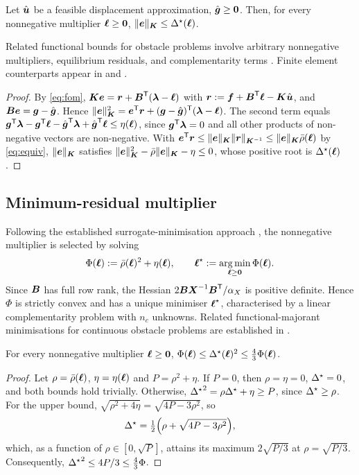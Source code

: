 \begin{proposition}\label{prop:certificate}
Let $\uh$ be a feasible displacement approximation, $\gh\ge\boldsymbol 0$. Then, for every nonnegative multiplier $\vell\ge\boldsymbol 0$, $\normK{\ve}\le\Dstar(\vell)$.
\end{proposition}
Related functional bounds for obstacle problems involve arbitrary nonnegative multipliers, equilibrium residuals, and complementarity terms
\cite[(2.12)--(2.13)]{repin2007}. Finite element counterparts appear in \cite[Lemma~1]{braess2005} and \cite[Sec.~4.2]{krause2015}.
\begin{proof}
By \eqref{eq:fom}, $\mK\ve=\vr+\mB\T(\vlam-\vell)$ with $\vr:=\vf+\mB\T\vell-\mK\uh$, and $\mB\ve=\vg-\gh$. Hence
$\normK{\ve}^2=\ve\T\vr+(\vg-\gh)\T(\vlam-\vell)$. The second term equals
$\vg\T\vlam-\vg\T\vell-\gh\T\vlam+\gh\T\vell\le\eta(\vell)$, since $\vg\T\vlam=0$ and all other products of non-negative vectors
are non-negative. With $\ve\T\vr\le\normK{\ve}\normKi{\vr}\le\normK{\ve}\rhob(\vell)$ by \eqref{eq:equiv}, $\normK{\ve}$ satisfies
$\normK{\ve}^2-\rhob\normK{\ve}-\eta\le0$, whose positive root is $\Dstar(\vell)$.
\end{proof}

\subsection{Minimum-residual multiplier}
Following the established surrogate-minimisation approach \cite{zhang2016thesis}, the nonnegative multiplier is selected by solving
\begin{equation}\label{eq:phi}
  \Phi(\vell):=\rhob(\vell)^2+\eta(\vell),\qquad \lmr:=\operatorname*{arg\,min}_{\vell\ge\boldsymbol 0}\Phi(\vell).
\end{equation}
Since $\mB$ has full row rank, the Hessian $2\mB\mX^{-1}\mB\T/\alpha_X$ is positive definite. Hence $\Phi$ is strictly convex and has a unique
minimiser $\lmr$, characterised by a linear complementarity problem with $n_c$ unknowns. Related functional-majorant minimisations for continuous
obstacle problems are established in \cite{repin2000,repin2007}.

\begin{lemma}\label{lem:phi}
For every nonnegative multiplier $\vell\ge\boldsymbol 0$, $\Phi(\vell)\le\Dstar(\vell)^2\le\frac43\Phi(\vell)$.
\end{lemma}
\begin{proof}
Let $\rho=\rhob(\vell)$, $\eta=\eta(\vell)$ and $P=\rho^2+\eta$. If $P=0$, then $\rho=\eta=0$, $\Dstar=0$, and both bounds hold trivially. Otherwise, ${\Dstar}^2=\rho\Dstar+\eta\ge P$, since $\Dstar\ge\rho$. For the upper bound, $\sqrt{\rho^2+4\eta}=\sqrt{4P-3\rho^2}$, so
\[
  \Dstar=\tfrac12\Big(\rho+\sqrt{4P-3\rho^2}\Big),
\]
which, as a function of $\rho\in[0,\sqrt P]$, attains its maximum $2\sqrt{P/3}$ at $\rho=\sqrt{P/3}$. Consequently, ${\Dstar}^2\le4P/3\le\frac43\Phi$.
\end{proof}

